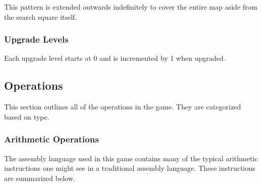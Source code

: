 \documentclass{article}
\begin{document}
This pattern is extended outwards indefinitely to cover the entire map aside
from the search square itself.

\subsubsection{Upgrade Levels}

Each upgrade level starts at 0 and is incremented by 1 when upgraded.

\subsection{Operations}

This section outlines all of the operations in the game. They are categorized
based on type.

\subsubsection{Arithmetic Operations}

The assembly language used in this game contains many of the typical
arithmetic instructions one might see in a traditional assembly language. These
instructions are summarized below.
\end{document}
